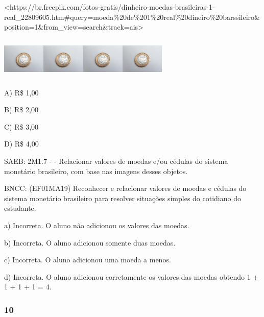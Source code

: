 \textless{}https://br.freepik.com/fotos-gratis/dinheiro-moedas-brasileiras-1-real\_22809605.htm\#query=moeda\%20de\%201\%20real\%20dineiro\%20barssileiro\&position=1\&from\_view=search\&track=ais\textgreater{}

\includegraphics[width=0.80577in,height=0.79447in]{media/image60.jpg}\includegraphics[width=0.80577in,height=0.79447in]{media/image60.jpg}\includegraphics[width=0.80577in,height=0.79447in]{media/image60.jpg}\includegraphics[width=0.80577in,height=0.79447in]{media/image60.jpg}

A) R\$ 1,00

B) R\$ 2,00

C) R\$ 3,00

D) R\$ 4,00

SAEB: 2M1.7 - - Relacionar valores de moedas e/ou cédulas do sistema
monetário brasileiro, com base nas imagens desses objetos.

BNCC: (EF01MA19) Reconhecer e relacionar valores de moedas e cédulas do
sistema monetário brasileiro para resolver situações simples do
cotidiano do estudante.

a) Incorreta. O aluno não adicionou os valores das moedas.

b) Incorreta. O aluno adicionou somente duas moedas.

c) Incorreta. O aluno adicionou uma moeda a menos.

d) Incorreta. O aluno adicionou corretamente os valores das moedas
obtendo 1 + 1 + 1 + 1 = 4.

\subsubsection{10}\label{section-111}

